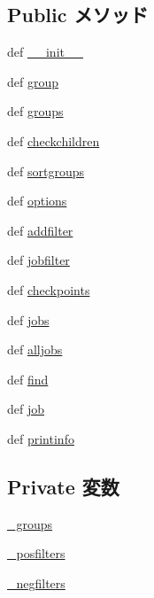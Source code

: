 \subsection*{Public メソッド}
\begin{DoxyCompactItemize}
\item 
def \hyperlink{classm5_1_1util_1_1jobfile_1_1Configuration_ac775ee34451fdfa742b318538164070e}{\_\-\_\-init\_\-\_\-}
\item 
def \hyperlink{classm5_1_1util_1_1jobfile_1_1Configuration_a47f703fc03b4740af29aa80f3ca41092}{group}
\item 
def \hyperlink{classm5_1_1util_1_1jobfile_1_1Configuration_a3c8f82f03a413047c5c3896bc4e75e63}{groups}
\item 
def \hyperlink{classm5_1_1util_1_1jobfile_1_1Configuration_a610cc5c8afb94de9aad93bf28aa9b41d}{checkchildren}
\item 
def \hyperlink{classm5_1_1util_1_1jobfile_1_1Configuration_a699d9fb6537280021513b63fc7765885}{sortgroups}
\item 
def \hyperlink{classm5_1_1util_1_1jobfile_1_1Configuration_a9eba36f181fad41a708f8b7658b2b173}{options}
\item 
def \hyperlink{classm5_1_1util_1_1jobfile_1_1Configuration_a7f0e011749a02d5cdba83b0a6b263a73}{addfilter}
\item 
def \hyperlink{classm5_1_1util_1_1jobfile_1_1Configuration_a98dcd3648b5228f41f31ea81fe6bcac7}{jobfilter}
\item 
def \hyperlink{classm5_1_1util_1_1jobfile_1_1Configuration_a966d8a5d601c4ec01a6fabd91a636095}{checkpoints}
\item 
def \hyperlink{classm5_1_1util_1_1jobfile_1_1Configuration_ac8eea5228226fcecada3edc3539c868e}{jobs}
\item 
def \hyperlink{classm5_1_1util_1_1jobfile_1_1Configuration_a0b74c8b88cfea4816e4710e34532c213}{alljobs}
\item 
def \hyperlink{classm5_1_1util_1_1jobfile_1_1Configuration_a01f90f57b7acd55e177611f5d0f7df23}{find}
\item 
def \hyperlink{classm5_1_1util_1_1jobfile_1_1Configuration_a50c9f5300dde5d896ec122ed9569d48e}{job}
\item 
def \hyperlink{classm5_1_1util_1_1jobfile_1_1Configuration_a40bc1aa85be1c4ba18cd144234c53984}{printinfo}
\end{DoxyCompactItemize}
\subsection*{Private 変数}
\begin{DoxyCompactItemize}
\item 
\hyperlink{classm5_1_1util_1_1jobfile_1_1Configuration_a9f92d6deaff1a0299428452ea47e01cc}{\_\-groups}
\item 
\hyperlink{classm5_1_1util_1_1jobfile_1_1Configuration_a2a7de25314ebac815b35ca1ef1fe064a}{\_\-posfilters}
\item 
\hyperlink{classm5_1_1util_1_1jobfile_1_1Configuration_ac7d67a3b6c9661a289ed4990fa6f1a04}{\_\-negfilters}
\end{DoxyCompactItemize}


